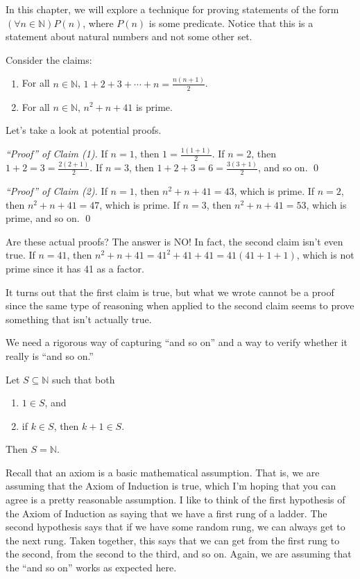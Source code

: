 In this chapter, we will explore a technique for proving statements of the form $(\forall n \in \mathbb{N})P(n)$, where $P(n)$ is some predicate.  Notice that this is a statement about natural numbers and not some other set.

Consider the claims:
\begin{enumerate}
\item For all $n\in\mathbb{N}$, $\displaystyle 1+2+3+\cdots +n=\frac{n(n+1)}{2}$.
\item For all $n\in\mathbb{N}$, $n^{2}+n+41$ is prime.
\end{enumerate}
Let's take a look at potential proofs.

\bigskip

\noindent \emph{``Proof'' of Claim (1).} If $n=1$, then $1=\frac{1(1+1)}{2}$.  If $n=2$, then $1+2=3=\frac{2(2+1)}{2}$.  If $n=3$, then $1+2+3=6=\frac{3(3+1)}{2}$, and so on. \hfill \qed

\bigskip

\noindent \emph{``Proof'' of Claim (2).} If $n=1$, then $n^{2}+n+41=43$, which is prime.  If $n=2$, then $n^{2}+n+41=47$, which is prime.  If $n=3$, then $n^{2}+n+41=53$, which is prime, and so on. \hfill \qed

\bigskip

Are these actual proofs?  The answer is NO!  In fact, the second claim isn't even true.  If $n=41$, then $n^{2}+n+41=41^{2}+41+41=41(41+1+1)$, which is not prime since it has 41 as a factor.

It turns out that the first claim is true, but what we wrote cannot be a proof since the same type of reasoning when applied to the second claim seems to prove something that isn't actually true.

We need a rigorous way of capturing ``and so on'' and a way to verify whether it really is ``and so on.''

\begin{axiom}
Let $S\subseteq \mathbb{N}$ such that both
\begin{enumerate}
\item $1\in S$, and
\item if $k\in S$, then $k+1\in S$.
\end{enumerate}
Then $S=\mathbb{N}$.
\end{axiom}

\begin{remark}
Recall that an axiom is a basic mathematical assumption.  That is, we are assuming that the Axiom of Induction is true, which I'm hoping that you can agree is a pretty reasonable assumption.  I like to think of the first hypothesis of the Axiom of Induction as saying that we have a first rung of a ladder.  The second hypothesis says that if we have some random rung, we can always get to the next rung.  Taken together, this says that we can get from the first rung to the second, from the second to the third, and so on.  Again, we are assuming that the ``and so on'' works as expected here.
\end{remark}

